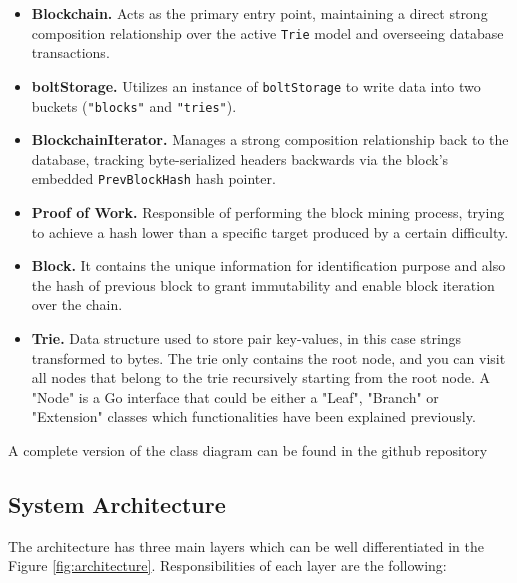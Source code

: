 \documentclass[10pt, conference]{IEEEtran}
\begin{document}
	\begin{itemize}
		\item \textbf{Blockchain.} Acts as the primary entry point, maintaining a direct strong composition relationship over the active \texttt{Trie} model and overseeing database transactions.
		\item \textbf{boltStorage.} Utilizes an instance of \texttt{boltStorage} to write data into two buckets (\texttt{"blocks"} and \texttt{"tries"}).
		\item \textbf{BlockchainIterator.} Manages a strong composition relationship back to the database, tracking byte-serialized headers backwards via the block's embedded \texttt{PrevBlockHash} hash pointer.
		\item \textbf{Proof of Work.} Responsible of performing the block mining process, trying to achieve a hash lower than a specific target produced by a certain difficulty.
		\item \textbf{Block.} It contains the unique information for identification purpose and also the hash of previous block to grant immutability and enable block iteration over the chain.
		\item \textbf{Trie.} Data structure used to store pair key-values, in this case strings transformed to bytes. The trie only contains the root node, and you can visit all nodes that belong to the trie recursively starting from the root node. A "Node" is a Go interface that could be either a "Leaf", "Branch" or "Extension" classes which functionalities have been explained previously.
	\end{itemize}
	
	A complete version of the class diagram can be found in the github repository \cite{jowy-ti_dsproject}
	
	\subsection{System Architecture}
	
	The architecture has three main layers which can be well differentiated in the Figure \ref{fig:architecture}. Responsibilities of each layer are the following:
	
\end{document}
